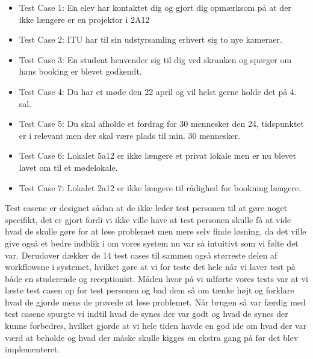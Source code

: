 \begin{itemize}
\item Test Case 1: En elev har kontaktet dig og gjort dig opmærksom på at der ikke længere er en projektor i 2A12
\item Test Case 2: ITU har til sin udstyrsamling erhvert sig to nye kameraer.
\item Test Case 3: En student henvender sig til dig ved skranken og spørger om hans booking er blevet godkendt.
\item Test Case 4: Du har et møde den 22 april og vil helst gerne holde det på 4. sal.
\item Test Case 5: Du skal afholde et fordrag for 30 mennesker den 24, tidspunktet er i relevant men der skal være plads til min. 30 mennesker.
\item Test Case 6: Lokalet 5a12 er ikke længere et privat lokale men er nu blevet lavet om til et mødelokale.
\item Test Case 7: Lokalet 2a12 er ikke længere til rådighed for bookning længere.
\end{itemize}
Test casene er designet sådan at de ikke leder test personen til at gøre noget specifikt, det er gjort fordi vi ikke ville have at test personen skulle få at vide hvad de skulle gøre for at løse problemet men mere selv finde løsning, da det ville give også et bedre indblik i om vores system nu var så intuitivt som vi følte det var. Derudover dækker de 14 test cases til sammen også størreste delen af workflowsne i systemet, hvilket gøre at vi for teste det hele når vi laver test på både en studerende og receptionist. Måden hvor på vi udførte vores tests var at vi læste test casen op for test personen og  bad dem så om tænke højt og forklare hvad de gjorde mens de prøvede at løse problemet. Når brugen så var færdig med test casene spurgte vi indtil hvad de synes der var godt og hvad de synes der kunne forbedres, hvilket gjorde at vi hele tiden havde en god ide om hvad der var værd at beholde og hvad der måske skulle kigges en ekstra gang på før det blev implementeret.

